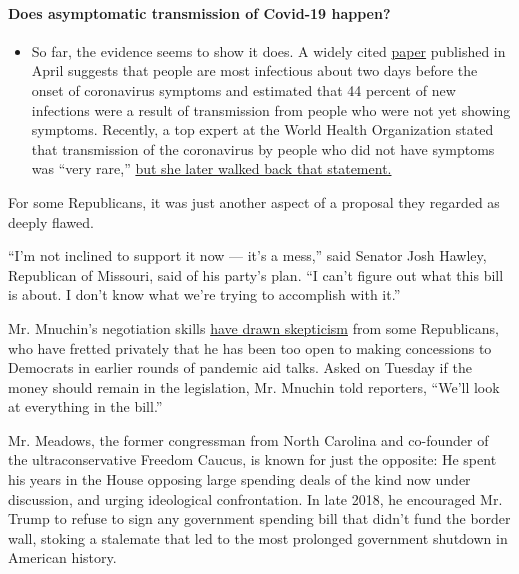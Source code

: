\begin{itemize}
{  \paragraph{Does asymptomatic transmission of Covid-19
  happen?}\label{does-asymptomatic-transmission-of-covid-19-happen}}

  \begin{itemize}
  \tightlist
  \item
    So far, the evidence seems to show it does. A widely cited
    \href{https://www.nature.com/articles/s41591-020-0869-5}{paper}
    published in April suggests that people are most infectious about
    two days before the onset of coronavirus symptoms and estimated that
    44 percent of new infections were a result of transmission from
    people who were not yet showing symptoms. Recently, a top expert at
    the World Health Organization stated that transmission of the
    coronavirus by people who did not have symptoms was ``very rare,''
    \href{https://www.nytimes.com/2020/06/09/world/coronavirus-updates.html?action=click\&pgtype=Article\&state=default\&region=MAIN_CONTENT_3\&context=storylines_faq\#link-1f302e21}{but
    she later walked back that statement.}
  \end{itemize}
\end{itemize}

For some Republicans, it was just another aspect of a proposal they
regarded as deeply flawed.

``I'm not inclined to support it now --- it's a mess,'' said Senator
Josh Hawley, Republican of Missouri, said of his party's plan. ``I can't
figure out what this bill is about. I don't know what we're trying to
accomplish with it.''

Mr. Mnuchin's negotiation skills
\href{https://www.nytimes.com/2020/04/17/us/politics/coronavirus-mnuchin-republicans.html}{have
drawn skepticism} from some Republicans, who have fretted privately that
he has been too open to making concessions to Democrats in earlier
rounds of pandemic aid talks. Asked on Tuesday if the money should
remain in the legislation, Mr. Mnuchin told reporters, ``We'll look at
everything in the bill.''

Mr. Meadows, the former congressman from North Carolina and co-founder
of the ultraconservative Freedom Caucus, is known for just the opposite:
He spent his years in the House opposing large spending deals of the
kind now under discussion, and urging ideological confrontation. In late
2018, he encouraged Mr. Trump to refuse to sign any government spending
bill that didn't fund the border wall, stoking a stalemate that led to
the most prolonged government shutdown in American history.

